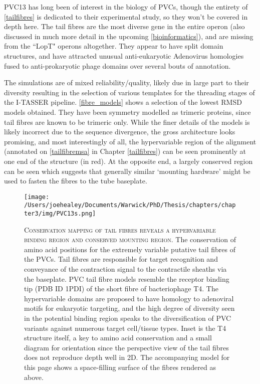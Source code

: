 PVC13 has long been of interest in the biology of PVCs, though the entirety of \vref{tailfibres} is dedicated to their experimental study, so they won't be covered in depth here. The tail fibres are the most diverse gene in the entire operon (also discussed in much more detail in the upcoming \ref{bioinformatics}), and are missing from the ``LopT" operons altogether. They appear to have split domain structures, and have attracted unusual anti-eukaryotic Adenovirus homologies fused to anti-prokaryotic phage domains over several bouts of annotation.

The simulations are of mixed reliability/quality, likely due in large part to their diversity resulting in the selection of various templates for the threading stages of the I-TASSER pipeline. \vref{fibre_models} shows a selection of the lowest RMSD models obtained. They have been symmetry modelled as trimeric proteins, since tail fibres are known to be trimeric only. While the finer details of the models is likely incorrect due to the sequence divergence, the gross architecture looks promising, and most interestingly of all, the hypervariable region of the alignment (annotated on \vref{tailfibremsa} in Chapter \ref{tailfibres}) can be seen prominently at one end of the structure (in red). At the opposite end, a largely conserved region can be seen which suggests that generally similar `mounting hardware' might be used to fasten the fibres to the tube baseplate.

\begin{landscape}
\begin{figure}[p]
 \centering
   \texttt{[image: /Users/joehealey/Documents/Warwick/PhD/Thesis/chapters/chapter3/img/PVC13s.png]}
 \captionsetup{singlelinecheck=off, justification=justified, font=footnotesize, aboveskip=10pt}
 \caption[Conservation mapping off putative tail fibre structures]{\textsc{\normalsize Conservation mapping of tail fibres reveals a hypervariable binding region and conserved mounting region.}\vspace{0.1cm} \newline The conservation of amino acid positions for the extremely variable putative tail fibres of the PVCs. Tail fibres are responsible for target recognition and conveyance of the contraction signal to the contractile sheaths via the baseplate. PVC tail fibre models resemble the receptor binding tip (PDB ID 1PDI) of the short fibre of bacteriophage T4. The hypervariable domains are proposed to have homology to adenoviral motifs for eukaryotic targeting, and the high degree of diversity seen in the potential binding region speaks to the diversification of PVC variants against numerous target cell/tissue types. Inset is the T4 structure itself, a key to amino acid conservation and a small diagram for orientation since the perspective view of the tail fibres does not reproduce depth well in 2D. The accompanying model for this page shows a space-filling surface of the fibres rendered as above. }
 \label{fibre_models}
\end{figure}
\end{landscape}




